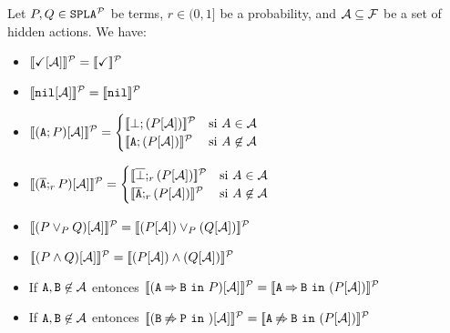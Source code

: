 \bprop
  Let $P,Q\in\mathtt{SPLA{^{\cal P}}}$ be terms, $r\in (0,1]$ be a probability, and
  ${\cal A}\subseteq{\cal F}$ be a set of hidden actions. We have:
  \begin{itemize}
  \item $[\![\checkmark[{\cal A}]]\!]^{\cal P}=[\![\checkmark]\!]^{\cal P}$
  \item $[\![\mathtt{nil}[{\cal A}]]\!]^{\cal P}=[\![\mathtt{nil}]\!]^{\cal P}$
  \item
      $\semdenp{(\fA;P)\hide\calA}=
      \begin{cases}
        \semdenp{\bot;(P\hide\calA)} & \mbox{si } A\in\calA\\
        \semdenp{\fA;(P\hide\calA)} & \mbox{si } A\not\in\calA\\
      \end{cases}$
  \item
      $\semdenp{(\ofA;_rP)\hide\calA}=
      \begin{cases}
        \semdenp{\overline{\bot};_r(P\hide\calA)} & \mbox{si } A\in\calA\\
        \semdenp{\ofA;_r(P\hide\calA)} & \mbox{si } A\not\in\calA\\
      \end{cases}$
  \item $[\![(P\mathbin{\lor}_P Q)[{\cal A}]]\!]^{\cal P}=[\![(P[{\cal A}])\mathbin{\lor}_P (Q[{\cal A}])]\!]^{\cal P}$
  \item $[\![(P\mathbin{\wedge} Q)[{\cal A}]]\!]^{\cal P}=[\![(P[{\cal A}])\mathbin{\wedge} (Q[{\cal A}])]\!]^{\cal P}$
  \item If ${\mathtt{A}},{\mathtt{B}}\not\in{\cal A}$ entonces
    $[\![(\mathtt{A}\mathbin{\Rightarrow}\mathtt{B}\ \mathtt{in}\ P)[{\cal A}]]\!]^{\cal P}=[\![\mathtt{A}\mathbin{\Rightarrow}\mathtt{B}\ \mathtt{in}\ (P[{\cal A}])]\!]^{\cal P}$
  \item If ${\mathtt{A}},{\mathtt{B}}\not\in{\cal A}$ entonces
    $[\![(\mathtt{B}\mathbin{\not\Rightarrow}\mathtt{P}\ \mathtt{in}\ )[{\cal A}]]\!]^{\cal P}=[\![\mathtt{A}\mathbin{\not\Rightarrow}\mathtt{B}\ \mathtt{in}\ (P[{\cal A}])]\!]^{\cal P}$
  \end{itemize}
\eprop


